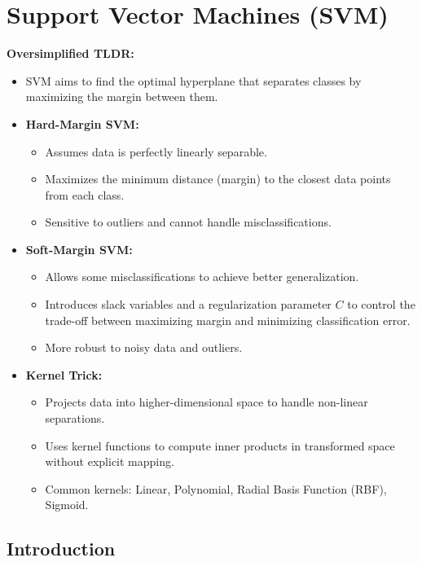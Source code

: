 \documentclass{article}
\begin{document}
\section{Support Vector Machines (SVM)}

\textbf{Oversimplified TLDR:}
\begin{itemize}
    \item SVM aims to find the optimal hyperplane that separates classes by maximizing the margin between them.
    \item \textbf{Hard-Margin SVM:}
    \begin{itemize}
        \item Assumes data is perfectly linearly separable.
        \item Maximizes the minimum distance (margin) to the closest data points from each class.
        \item Sensitive to outliers and cannot handle misclassifications.
    \end{itemize}
    \item \textbf{Soft-Margin SVM:}
    \begin{itemize}
        \item Allows some misclassifications to achieve better generalization.
        \item Introduces slack variables and a regularization parameter $C$ to control the trade-off between maximizing margin and minimizing classification error.
        \item More robust to noisy data and outliers.
    \end{itemize}
    \item \textbf{Kernel Trick:}
    \begin{itemize}
        \item Projects data into higher-dimensional space to handle non-linear separations.
        \item Uses kernel functions to compute inner products in transformed space without explicit mapping.
        \item Common kernels: Linear, Polynomial, Radial Basis Function (RBF), Sigmoid.
    \end{itemize}
\end{itemize}

\subsection{Introduction}
\end{document}
